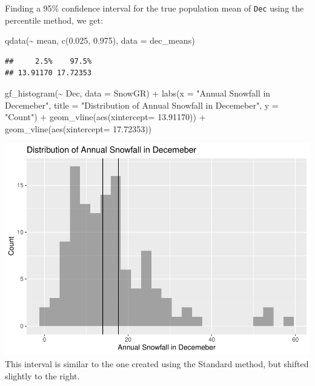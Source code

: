\documentclass[12pt]{article}
\newenvironment{Shaded}{\begin{snugshade}}{\end{snugshade}}
\newcommand{\AttributeTok}[1]{\textcolor[rgb]{0.77,0.63,0.00}{#1}}
\newcommand{\FloatTok}[1]{\textcolor[rgb]{0.00,0.00,0.81}{#1}}
\newcommand{\FunctionTok}[1]{\textcolor[rgb]{0.00,0.00,0.00}{#1}}
\newcommand{\NormalTok}[1]{#1}
\newcommand{\SpecialCharTok}[1]{\textcolor[rgb]{0.00,0.00,0.00}{#1}}
\newcommand{\StringTok}[1]{\textcolor[rgb]{0.31,0.60,0.02}{#1}}
\begin{document}
Finding a 95\% confidence interval for the true population mean of
\texttt{Dec} using the percentile method, we get:

\begin{Shaded}
\begin{Highlighting}[]
\FunctionTok{qdata}\NormalTok{(}\SpecialCharTok{\textasciitilde{}}\NormalTok{ mean, }\FunctionTok{c}\NormalTok{(}\FloatTok{0.025}\NormalTok{, }\FloatTok{0.975}\NormalTok{), }\AttributeTok{data =}\NormalTok{ dec\_means)}
\end{Highlighting}
\end{Shaded}

\begin{verbatim}
##     2.5%    97.5% 
## 13.91170 17.72353
\end{verbatim}

\begin{Shaded}
\begin{Highlighting}[]
\FunctionTok{gf\_histogram}\NormalTok{(}\SpecialCharTok{\textasciitilde{}}\NormalTok{ Dec, }\AttributeTok{data =}\NormalTok{ SnowGR) }\SpecialCharTok{+}
  \FunctionTok{labs}\NormalTok{(}\AttributeTok{x =} \StringTok{"Annual Snowfall in Decemeber"}\NormalTok{, }
       \AttributeTok{title =} \StringTok{"Distribution of Annual Snowfall in Decemeber"}\NormalTok{, }\AttributeTok{y =} \StringTok{"Count"}\NormalTok{) }\SpecialCharTok{+}
  \FunctionTok{geom\_vline}\NormalTok{(}\FunctionTok{aes}\NormalTok{(}\AttributeTok{xintercept=} \FloatTok{13.91170}\NormalTok{)) }\SpecialCharTok{+}
  \FunctionTok{geom\_vline}\NormalTok{(}\FunctionTok{aes}\NormalTok{(}\AttributeTok{xintercept=} \FloatTok{17.72353}\NormalTok{))}
\end{Highlighting}
\end{Shaded}

\includegraphics{paper_files/figure-latex/unnamed-chunk-7-1.pdf} This
interval is similar to the one created using the Standard method, but
shifted slightly to the right.
\end{document}
